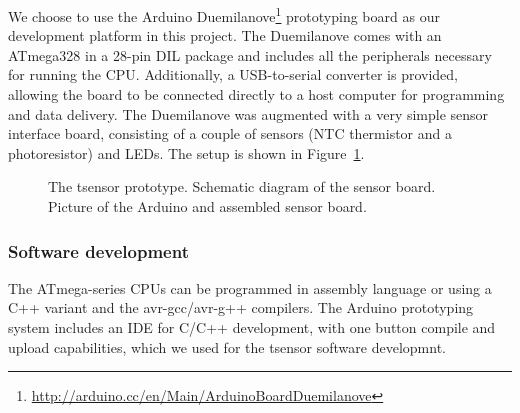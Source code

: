 We choose to use the Arduino Duemilanove\footnote{\url{http://arduino.cc/en/Main/ArduinoBoardDuemilanove}} prototyping board as our development platform in this project. The Duemilanove comes with an ATmega328 in a  28-pin DIL package and includes all the peripherals necessary for running the CPU. Additionally, a USB-to-serial converter is provided, allowing the board to be connected directly to a host computer for programming and data delivery.
%
The Duemilanove was augmented with a very simple sensor interface board, consisting of a couple of sensors (NTC thermistor and a photoresistor) and LEDs. The setup is shown in Figure~\ref{fig:tsensor}.
%

\begin{figure}[!t]
\centerline{
} 
\caption{The tsensor prototype. 
 Schematic diagram of the sensor board. 
 Picture of the Arduino and assembled sensor board.}
\label{fig:tsensor}
\end{figure}

\subsubsection{Software development} 

The ATmega-series CPUs can be programmed in assembly language or using a C++ variant and the avr-gcc/avr-g++ compilers. The Arduino prototyping system includes an IDE for C/C++ development, with one button compile and upload capabilities, which we used for the tsensor software developmnt.

